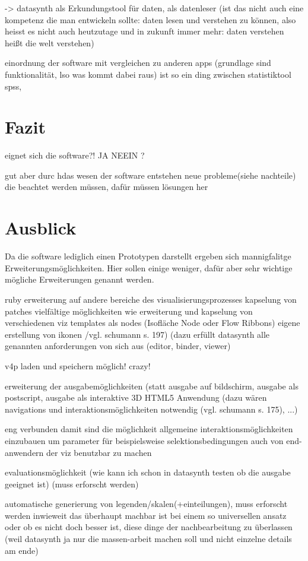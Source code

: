 \documentclass[a4paper, 12pt, DIVcalc, onepage, pdftex, headsepline, footsepline]{scrreprt}
\begin{document}
-> datasynth als Erkundungstool für daten, als datenleser (ist das nicht auch eine kompetenz
die man entwickeln sollte: daten lesen und verstehen zu können, also heisst es nicht auch heutzutage
und in zukunft immer mehr: daten verstehen heißt die welt verstehen)

einordnung der software mit vergleichen zu anderen apps (grundlage sind funktionalität, 
lso was kommt dabei raus) ist so ein ding zwischen statistiktool spss, 

\section{Fazit}
\label{sec:Fazit}
eignet sich die software?! JA NEEIN ?

gut aber durc hdas wesen der software entstehen neue probleme(siehe nachteile)
die beachtet werden müssen, dafür müssen lösungen her

\section{Ausblick}
\label{sec:Ausblick}
Da die software lediglich einen Prototypen darstellt ergeben sich mannigfalitge
Erweiterungsmöglichkeiten. Hier sollen einige weniger, dafür aber sehr wichtige
mögliche Erweiterungen genannt werden.

ruby
erweiterung auf andere bereiche des visualisierungsprozesses
kapselung von patches
  vielfältige möglichkeiten wie
    erweiterung und kapselung von verschiedenen viz templates als nodes (Isofläche Node oder Flow Ribbons)
    eigene erstellung von ikonen /vgl. schumann s. 197)
    (dazu erfüllt datasynth alle genannten anforderungen von sich aus (editor, binder, viewer)

v4p laden und speichern möglich! crazy!

erweiterung der ausgabemöglichkeiten (statt ausgabe auf bildschirm, ausgabe als
postscript, ausgabe als interaktive 3D HTML5 Anwendung (dazu wären navigations
und interaktionsmöglichkeiten notwendig (vgl. schumann s. 175), ...)

eng verbunden damit sind die möglichkeit allgemeine interaktionsmöglichkeiten
einzubauen um parameter für beispielsweise selektionsbedingungen auch von
end-anwendern der viz benutzbar zu machen

evaluationsmöglichkeit (wie kann ich schon in datasynth testen ob die ausgabe
geeignet ist) (muss erforscht werden)

automatische generierung von legenden/skalen(+einteilungen), muss erforscht
werden inwieweit das überhaupt machbar ist bei einem so universellen ansatz
oder ob es nicht doch besser ist, diese dinge der nachbearbeitung zu überlassen
(weil datasynth ja nur die massen-arbeit machen soll und nicht einzelne details am ende)
\end{document}
